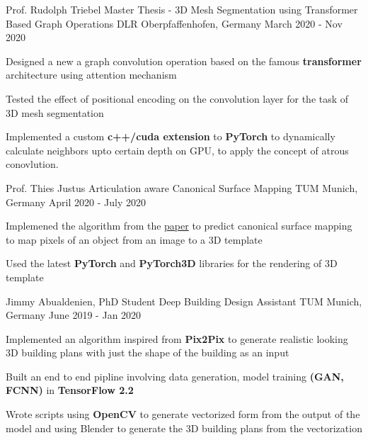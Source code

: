
\begin{cventries}
	
	\cventry
	{Prof. Rudolph Triebel} %
	{Master Thesis - 3D Mesh Segmentation using Transformer Based Graph Operations} %
	{DLR Oberpfaffenhofen, Germany} %
	{March 2020 - Nov 2020} %
	{
		\begin{cvitems} %
			\item {Designed a new a graph convolution operation based on the famous \textbf{transformer} architecture using attention mechanism}
			\item {Tested the effect of positional encoding on the convolution layer for the task of 3D mesh segmentation}
			\item {Implemented a custom \textbf{c++/cuda extension} to \textbf{PyTorch} to dynamically calculate neighbors upto certain depth on GPU, to apply the concept of atrous conovlution.}
		\end{cvitems}
	}

	\cventry
	{Prof. Thies Justus} %
	{Articulation aware Canonical Surface Mapping} %
	{TUM Munich, Germany} %
	{April 2020 - July 2020} %
	{
		\begin{cvitems} %
			\item {Implemened the algorithm from the \href{https://arxiv.org/abs/2004.00614}{paper} to predict canonical surface mapping to map pixels of an object from an image to a 3D template}
			\item {Used the latest \textbf{PyTorch} and \textbf{PyTorch3D} libraries for the rendering of 3D template}
		\end{cvitems}
	}

	\cventry
	{Jimmy Abualdenien, PhD Student} %
	{Deep Building Design Assistant} %
	{TUM Munich, Germany} %
	{June 2019 - Jan 2020} %
	{
		\begin{cvitems} %
			\item {Implemented an algorithm inspired from \textbf{Pix2Pix} to generate realistic looking 3D building plans with just the shape of the building as an input}
			\item {Built an end to end pipline involving data generation, model training \textbf{(GAN, FCNN)} in \textbf{TensorFlow 2.2}}
			\item {Wrote scripts using \textbf{OpenCV} to generate vectorized form from the output of the model and using Blender to generate the 3D building plans from the vectorization}
		\end{cvitems}
	}
	

\end{cventries}
